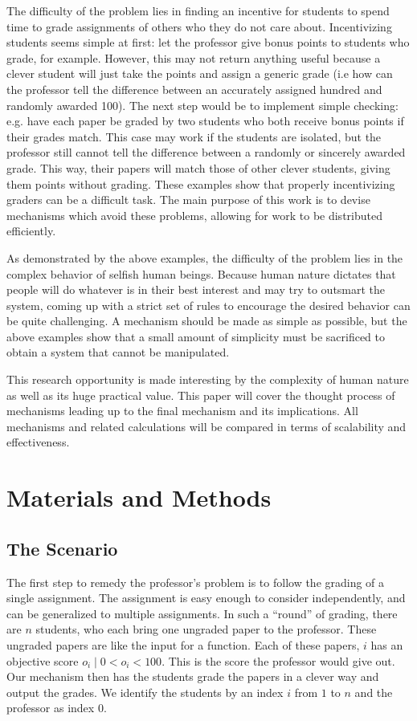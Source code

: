 \documentclass[12pt, Arial]{article}
\begin{document}
The difficulty of the problem lies in finding an incentive for students to spend time to grade assignments of others who they do not care about. Incentivizing students seems simple at first: let the professor give bonus points to students who grade, for example. However, this may not return anything useful because a clever student will just take the points and assign a generic grade (i.e how can the professor tell the difference between an accurately assigned hundred and randomly awarded 100). The next step would be to implement simple checking: e.g. have each paper be graded by two students who both receive bonus points if their grades match. This case may work if the students are isolated, but the professor still cannot tell the difference between a randomly or sincerely awarded grade. This way, their papers will match those of other clever students, giving them points without grading. These examples show that properly incentivizing graders can be a difficult task. The main purpose of this work is to devise mechanisms which avoid these problems, allowing for work to be distributed efficiently.

As demonstrated by the above examples, the difficulty of the problem lies in the complex behavior of selfish human beings. Because human nature dictates that people will do whatever is in their best interest and may try to outsmart the system, coming up with a strict set of rules to encourage the desired behavior can be quite challenging. A mechanism should be made as simple as possible, but the above examples show that a small amount of simplicity must be sacrificed to obtain a system that cannot be manipulated.

This research opportunity is made interesting by the complexity of human nature as well as its huge practical value. This paper will cover the thought process of mechanisms leading up to the final mechanism and its implications. All mechanisms and related calculations will be compared in terms of scalability and effectiveness.

\section{Materials and Methods}
\subsection{The Scenario}
The first step to remedy the professor's problem is to follow the grading of a single assignment. The assignment is easy enough to consider independently, and can be generalized to multiple assignments. In such a ``round'' of grading, there are $n$ students, who each bring one ungraded paper to the professor. These ungraded papers are like the input for a function. Each of these papers, $i$ has an objective score $o_i\mid 0<o_i<100$. This is the score the professor would give out. Our mechanism then has the students grade the papers in a clever way and output the grades. We identify the students by an index $i$ from $1$ to $n$ and the professor as index $0$.
\end{document}
